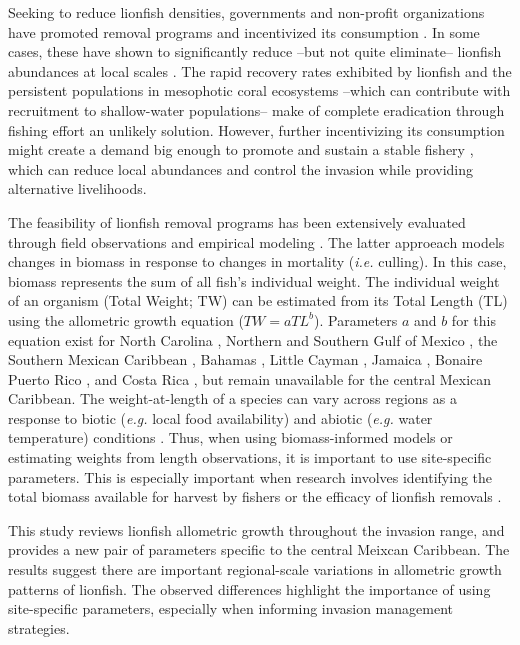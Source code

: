 \documentclass[fleqn,10pt,lineno]{wlpeerj} %
\begin{document}
Seeking to reduce lionfish densities, governments and non-profit
organizations have promoted removal programs and incentivized its
consumption \citep{chin_2016}. In some cases, these have shown to
significantly reduce --but not quite eliminate-- lionfish abundances at
local scales \citep{sandel_2015,chin_2016,deleon_2013}. The rapid
recovery rates exhibited by lionfish \citep{barbour_2011} and the
persistent populations in mesophotic coral ecosystems
\citep{andradibrown_2017} --which can contribute with recruitment to
shallow-water populations-- make of complete eradication through fishing
effort an unlikely solution. However, further incentivizing its
consumption might create a demand big enough to promote and sustain a
stable fishery \citep{chin_2016}, which can reduce local abundances and
control the invasion while providing alternative livelihoods.

The feasibility of lionfish removal programs has been extensively
evaluated through field
observations\citep{usseglio_2017,sandel_2015,chin_2016,deleon_2013} and
empirical modeling \citep{barbour_2011,morris_2011,johnston_2015}. The
latter approeach models changes in biomass in response to changes in
mortality (\emph{i.e.} culling). In this case, biomass represents the
sum of all fish's individual weight. The individual weight of an
organism (Total Weight; TW) can be estimated from its Total Length (TL)
using the allometric growth equation (\(TW = aTL^b\)). Parameters \(a\)
and \(b\) for this equation exist for North Carolina
\citep{barbour_2011}, Northern \citep{fogg_2013,dahl_2014} and Southern
Gulf of Mexico \citep{aguilarperera_2016}, the Southern Mexican
Caribbean \citep{sabidoitza_2016}, Bahamas \citep{darling_2011}, Little
Cayman \citep{edwards_2014}, Jamaica \citep{chin_2016}, Bonaire
\citep{deleon_2013} Puerto Rico \citep{toledohernndez_2014}, and Costa
Rica \citep{sandel_2015}, but remain unavailable for the central Mexican
Caribbean. The weight-at-length of a species can vary across regions as
a response to biotic (\emph{e.g.} local food availability) and abiotic
(\emph{e.g.} water temperature) conditions \citep{johnson_2016}. Thus,
when using biomass-informed models or estimating weights from length
observations, it is important to use site-specific parameters. This is
especially important when research involves identifying the total
biomass available for harvest by fishers \citep{chin_2016} or the
efficacy of lionfish removals
\citep{barbour_2011,morris_2011,johnston_2015}.

This study reviews lionfish allometric growth throughout the invasion
range, and provides a new pair of parameters specific to the central
Meixcan Caribbean. The results suggest there are important
regional-scale variations in allometric growth patterns of lionfish. The
observed differences highlight the importance of using site-specific
parameters, especially when informing invasion management strategies.
\end{document}
